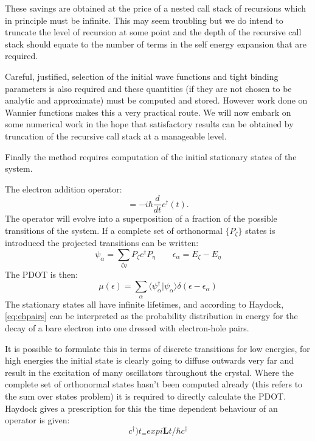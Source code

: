 \documentclass{article}
\def\ket{\rangle}
\def\bra{\langle}
\begin{document}
These savings are obtained at the price of a nested call stack of recursions which 
in principle must be infinite. This may seem troubling but we do intend to truncate
the level of recursion at some point and the depth of the recursive call stack should
equate to the number of terms in the self energy expansion that are required.

	Careful, justified, selection of the initial wave functions and tight binding parameters
is also required and these quantities (if they are not chosen to be analytic and approximate)
must be computed and stored. However work done on Wannier functions makes this a very
practical route. We will now embark on some numerical work in the hope that satisfactory 
results can be obtained by truncation of the recursive call stack at a manageable level. 

Finally the method requires computation of the initial stationary states of the system.

The electron addition operator:
%
\begin{equation}
[H, c^{\dagger}(t)] = -i\hbar \frac{d}{dt} c^{\dagger}(t).
\end{equation}
%
The operator will evolve into a superposition of a fraction of the 
possible transitions of the system. If a complete set of orthonormal $\{P_{\zeta}\}$ 
states is introduced the projected transitions can be written:
%
\begin{equation}
\psi_{\alpha} = \sum_{\zeta\eta} P_{\zeta}c^{\dagger}P_{\eta} \qquad \epsilon_{\alpha} = E_{\zeta} - E_{\eta}
\end{equation}
%
The PDOT is then:
%
\begin{equation}
\label{eq:ehpairs}
\mu(\epsilon) = \sum_{\alpha} \bra\psi_{\alpha}^{\dagger}|\psi_{\alpha}\ket \delta(\epsilon-\epsilon_{\alpha})
\end{equation}
%
The stationary states all have infinite lifetimes, and according to Haydock, \ref{eq:ehpairs} can
be interpreted as the probability distribution in energy for the decay of a bare electron into one dressed
with electron-hole pairs.

It is possible to formulate this in terms of discrete transitions for low energies, for high energies
the initial state is clearly going to diffuse outwards very far and result in the excitation of 
many oscillators throughout the crystal. Where the complete set of orthonormal states
hasn't been computed already (this refers to the sum over states problem) it is required to directly
calculate the PDOT. Haydock gives a prescription for this the time dependent behaviour of
an operator is given:
%
\begin{equation}
\label{eq:creationt}
c^{\dagger})t_ = exp{i\mathbf{L}t/\hbar} c^{\dagger}
\end{equation}
%
\end{document}
